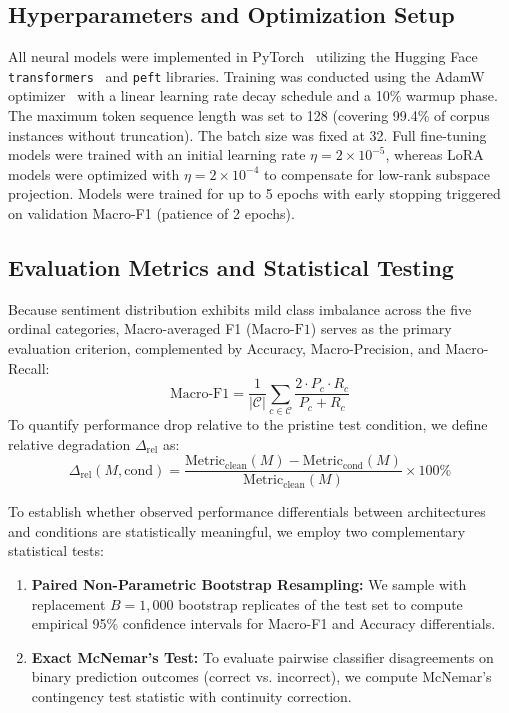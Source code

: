 \subsection{Hyperparameters and Optimization Setup}
All neural models were implemented in PyTorch~\cite{paszke2019pytorch} utilizing the Hugging Face \texttt{transformers}~\cite{wolf2020huggingface} and \texttt{peft} libraries. Training was conducted using the AdamW optimizer~\cite{loshchilov2019adamw} with a linear learning rate decay schedule and a 10\% warmup phase. The maximum token sequence length was set to 128 (covering 99.4\% of corpus instances without truncation). The batch size was fixed at 32. Full fine-tuning models were trained with an initial learning rate $\eta = 2 \times 10^{-5}$, whereas LoRA models were optimized with $\eta = 2 \times 10^{-4}$ to compensate for low-rank subspace projection. Models were trained for up to 5 epochs with early stopping triggered on validation Macro-F1 (patience of 2 epochs).

\subsection{Evaluation Metrics and Statistical Testing}
Because sentiment distribution exhibits mild class imbalance across the five ordinal categories, Macro-averaged F1 ($\text{Macro-F1}$) serves as the primary evaluation criterion, complemented by Accuracy, Macro-Precision, and Macro-Recall:
\begin{equation}
    \text{Macro-F1} = \frac{1}{|\mathcal{C}|} \sum_{c \in \mathcal{C}} \frac{2 \cdot P_c \cdot R_c}{P_c + R_c}
\end{equation}
To quantify performance drop relative to the pristine test condition, we define relative degradation $\Delta_{\text{rel}}$ as:
\begin{equation}
    \Delta_{\text{rel}}(M, \text{cond}) = \frac{\text{Metric}_{\text{clean}}(M) - \text{Metric}_{\text{cond}}(M)}{\text{Metric}_{\text{clean}}(M)} \times 100\%
\end{equation}

To establish whether observed performance differentials between architectures and conditions are statistically meaningful, we employ two complementary statistical tests:
\begin{enumerate}
    \item \textbf{Paired Non-Parametric Bootstrap Resampling:} We sample with replacement $B=1,000$ bootstrap replicates of the test set to compute empirical 95\% confidence intervals for Macro-F1 and Accuracy differentials.
    \item \textbf{Exact McNemar's Test:} To evaluate pairwise classifier disagreements on binary prediction outcomes (correct vs. incorrect), we compute McNemar's contingency test statistic with continuity correction.
\end{enumerate}

